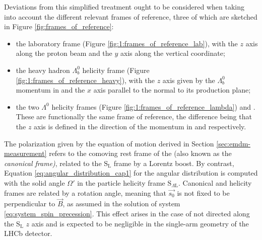 Deviations from this simplified treatment ought to be considered when taking into account the different relevant frames of reference, three of which are sketched in Figure \ref{fig:frames_of_reference}:
\begin{itemize}
	\item the laboratory frame \slab (Figure \ref{fig:1:frames_of_reference_lab}), with the $z$ axis along the proton beam and the $y$ axis along the vertical coordinate;
	\item the heavy hadron $\Lambda_b^0$ helicity frame \shad (Figure \ref{fig:1:frames_of_reference_heavy}), with the $z$ axis given by the $\Lambda_b^0$ momentum in \slab and the $x$ axis parallel to the normal to its production plane;
	\item the two $\Lambda^0$ helicity frames  \slambdal (Figure \ref{fig:1:frames_of_reference_lambda}) and \slambda. These are functionally the same frame of reference, the difference being that the $z$ axis is defined in the direction of the \lz momentum in \slab and \shad respectively.
\end{itemize}

The polarization given by the equation of motion derived in Section \ref{sec:emdm-measurement} refers to the comoving rest frame of the \lz (also known as the \textit{canonical frame)}, related to the $\text{S}_\text{L}$ frame by a Lorentz boost.
By contrast, Equation \eqref{eq:angular_distribution_cap1} for the angular distribution is computed with the solid angle $\Omega'$ in the particle helicity frame $\text{S}_{\Lambda\text{L}}$.
Canonical and helicity frames are related by a rotation angle, meaning that $\vec{s_0}$ is not fixed to be perpendicular to $\vec{B}$, as assumed in the solution of system  \eqref{eq:system_spin_precession}.
This effect arises in the case of \lz not directed along the $\text{S}_\text{L}$ $z$ axis and is expected to be negligible in the single-arm geometry of the LHCb detector.

